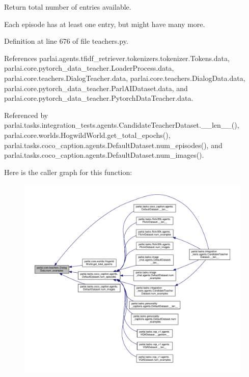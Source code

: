 \begin{DoxyVerb}Return total number of entries available.

Each episode has at least one entry, but might have many more.
\end{DoxyVerb}
 

Definition at line 676 of file teachers.\+py.



References parlai.\+agents.\+tfidf\+\_\+retriever.\+tokenizers.\+tokenizer.\+Tokens.\+data, parlai.\+core.\+pytorch\+\_\+data\+\_\+teacher.\+Loader\+Process.\+data, parlai.\+core.\+teachers.\+Dialog\+Teacher.\+data, parlai.\+core.\+teachers.\+Dialog\+Data.\+data, parlai.\+core.\+pytorch\+\_\+data\+\_\+teacher.\+Parl\+A\+I\+Dataset.\+data, and parlai.\+core.\+pytorch\+\_\+data\+\_\+teacher.\+Pytorch\+Data\+Teacher.\+data.



Referenced by parlai.\+tasks.\+integration\+\_\+tests.\+agents.\+Candidate\+Teacher\+Dataset.\+\_\+\+\_\+len\+\_\+\+\_\+(), parlai.\+core.\+worlds.\+Hogwild\+World.\+get\+\_\+total\+\_\+epochs(), parlai.\+tasks.\+coco\+\_\+caption.\+agents.\+Default\+Dataset.\+num\+\_\+episodes(), and parlai.\+tasks.\+coco\+\_\+caption.\+agents.\+Default\+Dataset.\+num\+\_\+images().

Here is the caller graph for this function\+:
\nopagebreak
\begin{figure}[H]
\begin{center}
\leavevmode
\includegraphics[width=350pt]{classparlai_1_1core_1_1teachers_1_1DialogData_a8deee9e9e45ae8162270bdcdfd7916b6_icgraph}
\end{center}
\end{figure}
\mbox{\label{classparlai_1_1core_1_1teachers_1_1DialogData_ada6f4dc4e2a8a84fba5f1e54d214d15e}} 
